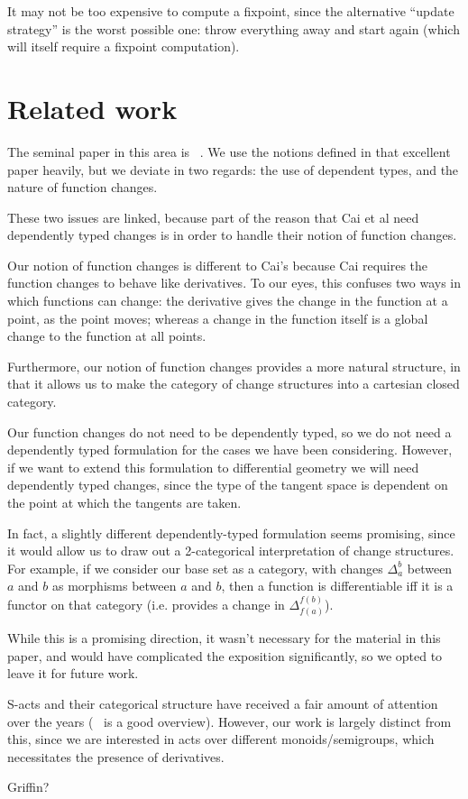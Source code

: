 It may not be too expensive to compute a fixpoint, since the alternative
``update strategy'' is the worst possible one: throw everything away and start
again (which will itself require a fixpoint computation).

\section{Related work}

The seminal paper in this area is ~\cite{cai2014changes}. We use the notions
defined in that excellent paper heavily, but we deviate in two regards: the use of
dependent types, and the nature of function changes.

These two issues are linked, because part of the reason that Cai et al need
dependently typed changes is in order to handle their notion of function
changes.

Our notion of function changes is different to Cai's because Cai requires the
function changes to behave like derivatives. To our eyes, this confuses two ways
in which functions can change: the derivative gives the change in the function
at a point, as the point moves; whereas a change in the function itself is a
global change to the function at all points.

Furthermore, our notion of function changes provides a more natural structure,
in that it allows us to make the category of change structures into a cartesian
closed category.

Our function changes do not need to be dependently typed, so we do not need a
dependently typed formulation for the cases we have been considering. However,
if we want to extend this formulation to differential geometry we will need
dependently typed changes, since the type of the tangent space is
dependent on the point at which the tangents are taken.

In fact, a slightly different dependently-typed formulation seems promising, since it would allow us
to draw out a 2-categorical interpretation of change structures. For example, if
we consider our base set as a category, with changes $\Delta_a^b$ between $a$
and $b$ as morphisms between $a$ and $b$, then a function is
differentiable iff it is a functor on that category (i.e. provides a change in $\Delta_{f(a)}^{f(b)}$).

While this is a promising direction, it wasn't necessary for the material in
this paper, and would have complicated the exposition significantly, so we opted
to leave it for future work.

S-acts and their categorical structure have received a fair amount of attention
over the years (~\cite{kilp2000monoids} is a good overview). However, our work
is largely distinct from this, since we are interested in acts over different
monoids/semigroups, which necessitates the presence of derivatives.

Griffin?




